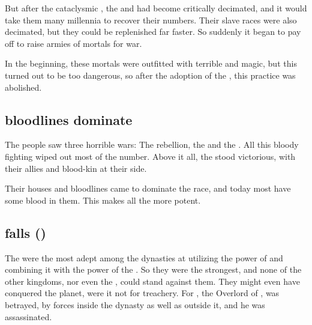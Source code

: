 But after the cataclysmic \secondbanewar, the \dragons{} and \resphain{} had become critically decimated, and it would take them many millennia to recover their numbers. Their slave races were also decimated, but they could be replenished far faster. So suddenly it began to pay off to raise armies of mortals for war. 

In the beginning, these mortals were outfitted with terrible  and magic, but this turned out to be too dangerous, so after the adoption of the , this practice was abolished. 









\subsection{\Sathariah{} bloodlines dominate}
The \resphan{} people saw three horrible wars: The rebellion, the \secondbanewar{} and the \resphanwars. 
All this bloody fighting wiped out most of the number. Above it all, the \satharioth{} stood victorious, with their allies and blood-kin at their side. 

Their houses and bloodlines came to dominate the \resphan{} race, and today most \resphain{} have some \sathariah{} blood in them. This makes  all the more potent. 










\subsection[Mystraacht falls]{\Mystraacht{} falls ()}
The \Mystraacht{} were the most adept among the dynasties at utilizing the power of \chaos{} and combining it with the \erebean{} power of the \banes. 
So they were the strongest, and none of the other \resphan{} kingdoms, nor even the \dragons, could stand against them. 
They might even have conquered the planet, were it not for treachery. 
For , the Overlord of \Mystraacht{}, was betrayed, by forces inside the dynasty as well as outside it, and he was assassinated. 





